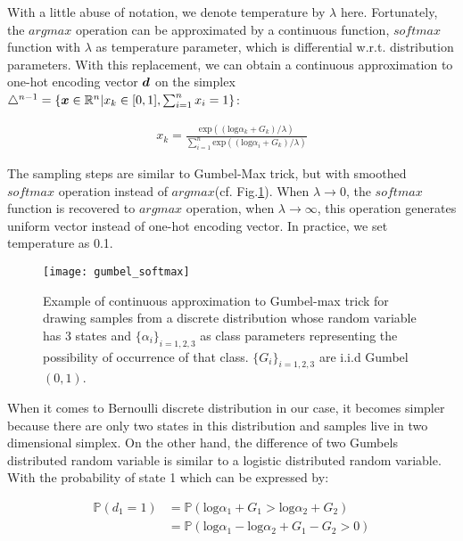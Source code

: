 With a little abuse of notation, we denote temperature by $\lambda$ here. Fortunately, the $argmax$ operation can be approximated by a continuous function, $softmax$ function with $\lambda$ as temperature parameter, which is differential w.r.t. distribution parameters. With this replacement, we can obtain a continuous approximation to one-hot encoding vector $\boldsymbol d$ on the simplex $\triangle^{n-1} = \{\boldsymbol x \in \mathbb R^n | x_k \in [0,1], \sum_{i=1}^{n} x_i = 1 \}$:

\begin{equation} \label{gumbel_softmax}
\begin{aligned}
x_{k} = \frac{\text{exp}((\text{log}\alpha_k + G_k)/\lambda)}{\sum_{i=1}^{n}\text{exp}((\text{log}\alpha_i + G_k)/\lambda)}
\end{aligned}
\end{equation}

The sampling steps are similar to Gumbel-Max trick, but with smoothed $softmax$ operation instead of $argmax$(cf. Fig.\ref{fig:gumbel_softmax}). When $\lambda \rightarrow 0$, the $softmax$ function is recovered to $argmax$ operation, when $\lambda \rightarrow \infty$, this operation generates uniform vector instead of one-hot encoding vector. In practice, we set temperature as 0.1.

\begin{figure}[h!]
	\begin{center}
		\texttt{[image: gumbel\_softmax]}
		\caption{Example of continuous approximation to Gumbel-max trick for drawing samples from a discrete distribution whose random variable has 3 states and $\{\alpha_{i}\}_{i=1,2,3}$ as class parameters representing the possibility of occurrence of that class. $\{G_{i}\}_{i=1,2,3}$ are i.i.d Gumbel$(0,1)$\cite{maddison2016concrete}.}		
		\label{fig:gumbel_softmax}
	\end{center}
\end{figure}

When it comes to Bernoulli discrete distribution in our case, it becomes simpler because there are only two states in this distribution and samples live in two dimensional simplex. On the other hand, the difference of two Gumbels distributed random variable is similar to a logistic distributed random variable.  With the probability of state 1 which can be expressed by:

\[
\begin{aligned}
\mathbb P(d_1 = 1) &= \mathbb P(\text{log} \alpha_1 + G_1 >\text{log} \alpha_2 + G_2)\\
&=\mathbb P(\text{log} \alpha_1 - \text{log} \alpha_2 + G_1 - G_2 > 0)
\end{aligned}
\] 

